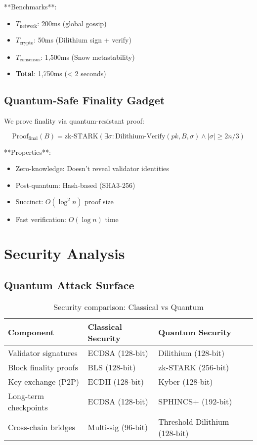 \documentclass[11pt,letterpaper]{article}
\begin{document}
**Benchmarks**:
\begin{itemize}
    \item $T_{\text{network}}$: 200ms (global gossip)
    \item $T_{\text{crypto}}$: 50ms (Dilithium sign + verify)
    \item $T_{\text{consensus}}$: 1,500ms (Snow metastability)
    \item \textbf{Total}: 1,750ms (< 2 seconds)
\end{itemize}

\subsection{Quantum-Safe Finality Gadget}

We prove finality via quantum-resistant proof:

\begin{equation}
\text{Proof}_{\text{final}}(B) = \text{zk-STARK}(\exists \sigma : \text{Dilithium-Verify}(pk, B, \sigma) \land |\sigma| \geq 2n/3)
\end{equation}

**Properties**:
\begin{itemize}
    \item Zero-knowledge: Doesn't reveal validator identities
    \item Post-quantum: Hash-based (SHA3-256)
    \item Succinct: $O(\log^2 n)$ proof size
    \item Fast verification: $O(\log n)$ time
\end{itemize}

\section{Security Analysis}

\subsection{Quantum Attack Surface}

\begin{table}[h]
\centering
\begin{tabular}{lll}
\toprule
\textbf{Component} & \textbf{Classical Security} & \textbf{Quantum Security} \\
\midrule
Validator signatures & ECDSA (128-bit) & Dilithium (128-bit) \\
Block finality proofs & BLS (128-bit) & zk-STARK (256-bit) \\
Key exchange (P2P) & ECDH (128-bit) & Kyber (128-bit) \\
Long-term checkpoints & ECDSA (128-bit) & SPHINCS+ (192-bit) \\
Cross-chain bridges & Multi-sig (96-bit) & Threshold Dilithium (128-bit) \\
\bottomrule
\end{tabular}
\caption{Security comparison: Classical vs Quantum}
\end{table}
\end{document}
